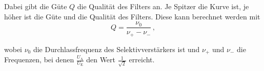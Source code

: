 \noindent
Dabei gibt die Güte $Q$ die Qualität des Filters an. Je Spitzer die Kurve ist, je höher ist die Güte und die Qualität des Filters. Diese kann berechnet werden mit 
\begin{equation}
        \label{eqn:güte}
        Q = \frac{\nu_0}{\nu_+ - \nu_-} \, ,
\end{equation}

\noindent
wobei $\nu_0$ die Durchlassfrequenz des Selektivverstärkers ist und $\nu_+$ und $\nu_-$ die Frequenzen, bei denen $\frac{U_\text{A}}{U_\text{E}}$ den Wert $\frac{1}{\sqrt{2}}$ erreicht.


